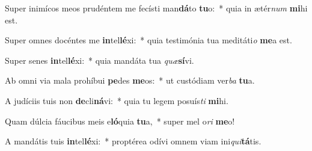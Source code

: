 \item Super inimícos meos prudéntem me fecísti man\textbf{dá}to \textbf{tu}o:~* quia in ætér\textit{num} \textbf{mi}hi est.
\item Super omnes docéntes me \textbf{in}tel\textbf{lé}xi:~* quia testimónia tua meditáti\textit{o} \textbf{me}a est.
\item Super senes \textbf{in}tel\textbf{lé}xi:~* quia mandáta tua \textit{quæ}\textbf{sí}vi.
\item Ab omni via mala prohíbui \textbf{pe}des \textbf{me}os:~* ut custódiam ver\textit{ba} \textbf{tu}a.
\item A judíciis tuis non \textbf{de}cli\textbf{ná}vi:~* quia tu legem posuís\textit{ti} \textbf{mi}hi.
\item Quam dúlcia fáucibus meis e\textbf{ló}quia \textbf{tu}a,~* super mel o\textit{ri} \textbf{me}o!
\item A mandátis tuis \textbf{in}tel\textbf{lé}xi:~* proptérea odívi omnem viam ini\textit{qui}\textbf{tá}tis.
